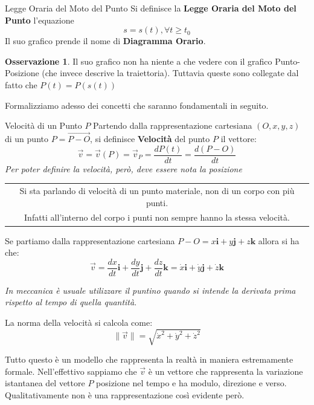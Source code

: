 \documentclass[11pt,a4paper,twoside]{article}
\theoremstyle{definition}
\newtheorem*{oss}{Osservazione}
\begin{document}
\begin{defn}{Legge Oraria del Moto del Punto}{}
	Si definisce la \textbf{Legge Oraria del Moto del Punto} l'equazione \[s = s(t), \forall t \geq t_0\]
	Il suo grafico prende il nome di \textbf{Diagramma Orario}.
\end{defn}

\begin{oss}
	Il suo grafico non ha niente a che vedere con il grafico Punto-Posizione (che invece descrive la traiettoria). Tuttavia queste sono collegate dal fatto che $P(t) = P(s(t))$
\end{oss}

Formalizziamo adesso dei concetti che saranno fondamentali in seguito.

\begin{defn}{Velocità di un Punto $P$}{}
	Partendo dalla rappresentazione cartesiana $(O, x, y, z)$ di un punto $P = \vec{P-O}$, si definisce \textbf{Velocità} del punto $P$ il vettore:
	\[\vec v = \vec v(P) = \vec v_P = \frac{dP(t)}{dt} = \frac{d(P-O)}{dt}\]
	\textit{Per poter definire la velocità, però, deve essere nota la posizione}
\end{defn}

\begin{center}
	\begin{tabular}{|c|}
		\hline
		Si sta parlando di velocità di un punto materiale, non di un corpo con più punti.\\
		Infatti all'interno del corpo i punti non sempre hanno la stessa velocità.\\
		\hline
	\end{tabular}
\end{center}

Se partiamo dalla rappresentazione cartesiana $P-O = x\mathbf i + y\mathbf j + z \mathbf k$ allora si ha che:
\[ \vec v = \frac{dx}{dt} \mathbf i + \frac{dy}{dt} \mathbf j + \frac{dz}{dt} \mathbf k = \dot x \mathbf i + \dot y \mathbf j + \dot z \mathbf k\]

\textit{In meccanica è usuale utilizzare il puntino quando si intende la derivata prima rispetto al tempo di quella quantità}.


La norma della velocità si calcola come:
\[\| \vec v\| = \sqrt{\dot x^2 + \dot y^2 + \dot z^2}\]

Tutto questo è un modello che rappresenta la realtà in maniera estremamente formale. Nell'effettivo sappiamo che $\vec v$ è un vettore che rappresenta la variazione istantanea del vettore $P$ posizione nel tempo e ha modulo, direzione e verso.
Qualitativamente non è una rappresentazione così evidente però.
\end{document}
